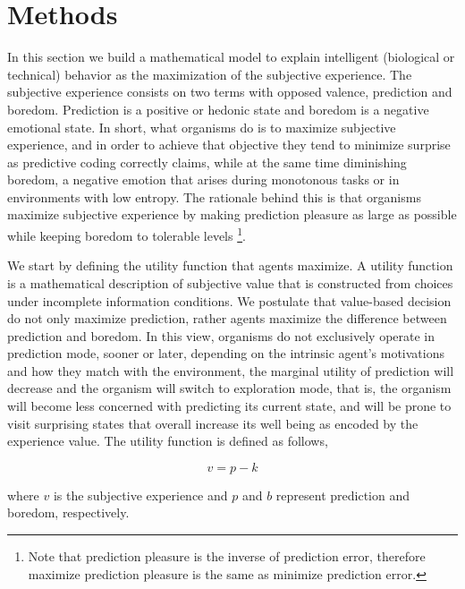 \documentclass[11pt, onecolumn]{article}
\begin{document}
\section{Methods}
\label{se:methods}

In this section we build a mathematical model to explain intelligent (biological or technical) behavior as the maximization of the subjective experience. 
The subjective experience consists on two terms with opposed valence, prediction and boredom. Prediction is a positive or hedonic state and boredom is a negative emotional state. In short, what organisms do is to maximize subjective experience, and in order to achieve that objective they tend to minimize surprise as predictive coding correctly claims, while at the same time diminishing boredom, a negative emotion that arises during monotonous tasks or in environments with low entropy. The rationale behind this is that organisms maximize subjective experience by making prediction pleasure as large as possible while keeping boredom to tolerable levels \footnote{Note that prediction pleasure is the inverse of prediction error, therefore maximize prediction pleasure is the same as minimize prediction error.}.


We start by defining the utility function that agents maximize. 
A utility function is a mathematical description of subjective value that is constructed from choices under incomplete information conditions. We postulate that value-based decision do not only maximize prediction, rather agents maximize the difference between prediction and boredom. In this view, organisms do not exclusively operate in prediction mode, sooner or later, depending on the intrinsic agent's motivations and how they match with the environment, the marginal utility of prediction will decrease and the organism will switch to exploration mode, that is, the organism will become less concerned with predicting its current state, and  will be prone to visit surprising states that overall increase its well being as encoded by the experience value. 
The utility function is defined as follows,

\begin{equation}
    v =  p - k
\label{eq:vpb}
\end{equation}

where $v$ is the subjective experience and $p$ and $b$ represent prediction and boredom, respectively. 
\end{document}
